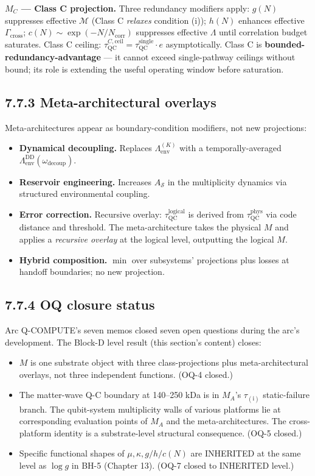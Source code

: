 \documentclass[11pt]{book}
\begin{document}
\textbf{$M_C$ — Class C projection.} Three redundancy modifiers apply: $g(N)$ suppresses effective $\mathcal{M}$ (Class C \textit{relaxes} condition (i)); $h(N)$ enhances effective $\Gamma_\mathrm{cross}$; $c(N) \sim \exp(-N/N_\mathrm{corr})$ suppresses effective $\Lambda$ until correlation budget saturates. Class C ceiling: $\tau_\mathrm{QC}^{C, \mathrm{ceil}} = \tau_\mathrm{QC}^\mathrm{single} \cdot e$ asymptotically. Class C is \textbf{bounded-redundancy-advantage} — it cannot exceed single-pathway ceilings without bound; its role is extending the useful operating window before saturation.

\subsection{7.7.3 Meta-architectural overlays}

Meta-architectures appear as boundary-condition modifiers, not new projections:

\begin{itemize}
\item \textbf{Dynamical decoupling.} Replaces $\Lambda_\mathrm{env}^{(K)}$ with a temporally-averaged $\Lambda_\mathrm{env}^\mathrm{DD}(\omega_\mathrm{decoup})$.
\item \textbf{Reservoir engineering.} Increases $A_\mathcal{S}$ in the multiplicity dynamics via structured environmental coupling.
\item \textbf{Error correction.} Recursive overlay: $\tau_\mathrm{QC}^\mathrm{logical}$ is derived from $\tau_\mathrm{QC}^\mathrm{phys}$ via code distance and threshold. The meta-architecture takes the physical $M$ and applies a \textit{recursive overlay} at the logical level, outputting the logical $M$.
\item \textbf{Hybrid composition.} $\min$ over subsystems' projections plus losses at handoff boundaries; no new projection.
\end{itemize}

\subsection{7.7.4 OQ closure status}

Arc Q-COMPUTE's seven memos closed seven open questions during the arc's development. The Block-D level result (this section's content) closes:

\begin{itemize}
\item $M$ is one substrate object with three class-projections plus meta-architectural overlays, not three independent functions. (OQ-4 closed.)
\item The matter-wave Q-C boundary at 140–250 kDa is in $M_A$'s $\tau_{(\mathrm{i})}$ static-failure branch. The qubit-system multiplicity walls of various platforms lie at corresponding evaluation points of $M_A$ and the meta-architectures. The cross-platform identity is a substrate-level structural consequence. (OQ-5 closed.)
\item Specific functional shapes of $\mu, \kappa, g/h/c(N)$ are INHERITED at the same level as $\log g$ in BH-5 (Chapter 13). (OQ-7 closed to INHERITED level.)
\end{itemize}
\end{document}
